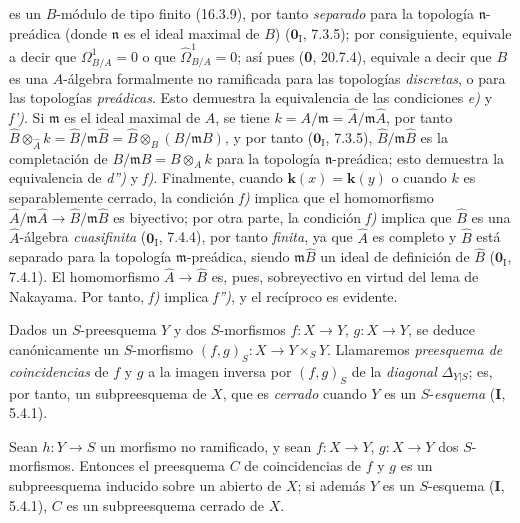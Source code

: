es un $B$-módulo de tipo finito (16.3.9), por tanto \emph{separado} para la topología $\mathfrak n$-preádica (donde $\mathfrak n$ es el ideal maximal de $B$) ($\mathbf{0}_{\mathrm I}$, 7.3.5); por consiguiente, equivale a decir que $\Omega^1_{B/A}=0$ o que $\widehat{\Omega}^1_{B/A}=0$; así pues (\textbf 0, 20.7.4), equivale a decir que $B$ es una $A$-álgebra formalmente no ramificada para las topologías \emph{discretas}, o para las topologías \emph{preádicas}. Esto demuestra la equivalencia de las condiciones \emph{e)} y \emph{f')}. Si $\mathfrak m$ es el ideal maximal de $A$, se tiene
$k=A/\mathfrak m=\widehat A/\mathfrak m\widehat A$, por tanto $\widehat B\otimes_{\widehat A}k=\widehat B/\mathfrak m\widehat B=\widehat B\otimes_B(B/\mathfrak m B)$,
y por tanto ($\mathbf{0}_{\mathrm I}$, 7.3.5), $\widehat B/\mathfrak m\widehat B$ es la completación de $B/\mathfrak m B=B\otimes_A k$ para la topología $\mathfrak n$-preádica; esto demuestra la equivalencia de \emph{d'')} y \emph{f)}. Finalmente, cuando $\boldsymbol{k}(x)=\boldsymbol{k}(y)$ o cuando $k$ es separablemente cerrado, la condición \emph{f)} implica que el homomorfismo $\widehat A/\mathfrak m\widehat A\to\widehat B/\mathfrak m\widehat B$ es biyectivo; por otra parte, la condición \emph{f)} implica que $\widehat B$ es una $\widehat A$-álgebra \emph{cuasifinita} ($\mathbf{0}_{\mathrm I}$, 7.4.4), por tanto \emph{finita}, ya que $\widehat A$ es completo y $\widehat B$ está separado para la topología $\mathfrak m$-preádica, siendo $\mathfrak m\widehat B$ un ideal de definición de $\widehat B$ ($\mathbf{0}_{\mathrm I}$, 7.4.1). El homomorfismo $\widehat A\to\widehat B$ es, pues, sobreyectivo en virtud del lema de Nakayama. Por tanto, \emph{f)} implica \emph{f'')}, y el recíproco es evidente.

\begin{env}[17.4.5]
\label{IV.17.4.5}
Dados un $S$-preesquema $Y$ y dos $S$-morfismos $f:X\to Y$, $g:X\to Y$, se deduce canónicamente un $S$-morfismo $(f,g)_S:X\to Y\times_S Y$. Llamaremos \emph{preesquema de coincidencias} de $f$ y $g$ a la imagen inversa por $(f,g)_S$ de la \emph{diagonal} $\Delta_{Y|S}$; es, por tanto, un subpreesquema de $X$, que es \emph{cerrado} cuando $Y$ es un $S$-\emph{esquema} (\textbf I, 5.4.1).
\end{env}

\begin{proposition}[17.4.6]
\label{IV.17.4.6}
Sean $h:Y\to S$ un morfismo no ramificado, y sean $f:X\to Y$, $g:X\to Y$ dos $S$-morfismos. Entonces el preesquema $C$ de coincidencias de $f$ y $g$ es un subpreesquema inducido sobre un abierto de $X$; si además $Y$ es un $S$-esquema \textup{(\textbf I, 5.4.1)}, $C$ es un subpreesquema cerrado de $X$.
\end{proposition}

